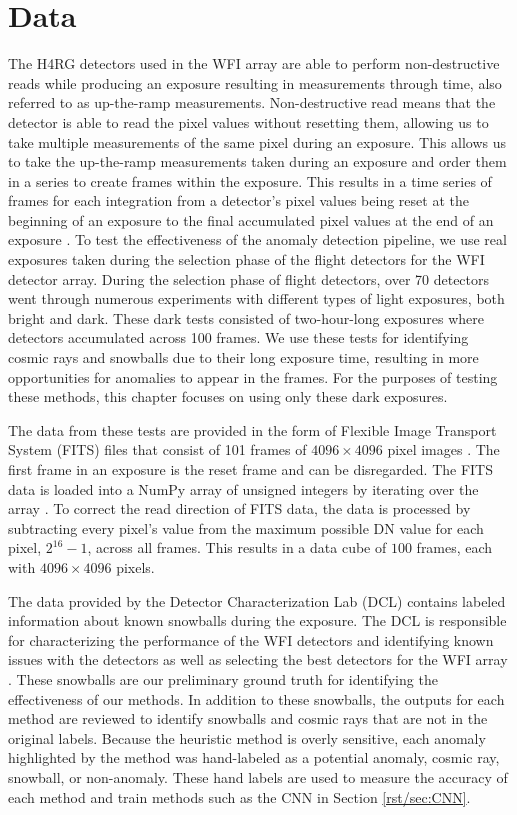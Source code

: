 \section{Data}
\label{rst/sec:data}
The H4RG detectors used in the WFI array are able to perform non-destructive reads while producing an exposure resulting in measurements through time, also referred to as up-the-ramp measurements. 
Non-destructive read means that the detector is able to read the pixel values without resetting them, allowing us to take multiple measurements of the same pixel during an exposure.
This allows us to take the up-the-ramp measurements taken during an exposure and order them in a series to create frames within the exposure. 
This results in a time series of frames for each integration from a detector's pixel values being reset at the beginning of an exposure to the final accumulated pixel values at the end of an exposure \parencite{casertano2022determining}.
To test the effectiveness of the anomaly detection pipeline, we use real exposures taken during the selection phase of the flight detectors for the WFI detector array. 
During the selection phase of flight detectors, over 70 detectors went through numerous experiments with different types of light exposures, both bright and dark.
These dark tests consisted of two-hour-long exposures where detectors accumulated across 100 frames.
We use these tests for identifying cosmic rays and snowballs due to their long exposure time, resulting in more opportunities for anomalies to appear in the frames. 
For the purposes of testing these methods, this chapter focuses on using only these dark exposures. 

The data from these tests are provided in the form of Flexible Image Transport System (FITS) files that consist of 101 frames of $4096 \times 4096$ pixel images \parencite{wells1979fits}.
The first frame in an exposure is the reset frame and can be disregarded. 
The FITS data is loaded into a NumPy array of unsigned integers by iterating over the array \parencite{harris2020array}.
To correct the read direction of FITS data, the data is processed by subtracting every pixel's value from the maximum possible DN value for each pixel, $2^{16} - 1$, across all frames.
This results in a data cube of $100$ frames, each with $4096 \times 4096$ pixels. 

The data provided by the Detector Characterization Lab (DCL) contains labeled information about known snowballs during the exposure. 
The DCL is responsible for characterizing the performance of the WFI detectors and identifying known issues with the detectors as well as selecting the best detectors for the WFI array \parencite{Mosby_2020}.
These snowballs are our preliminary ground truth for identifying the effectiveness of our methods. 
In addition to these snowballs, the outputs for each method are reviewed to identify snowballs and cosmic rays that are not in the original labels.
Because the heuristic method is overly sensitive, each anomaly highlighted by the method was hand-labeled as a potential anomaly, cosmic ray, snowball, or non-anomaly. 
These hand labels are used to measure the accuracy of each method and train methods such as the CNN in Section \ref{rst/sec:CNN}.

